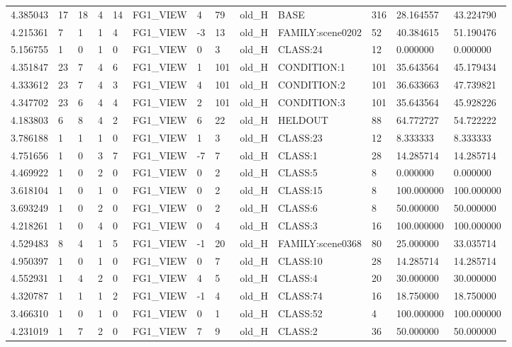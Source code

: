 \begin{tabular}{lllllllllllll}
4.385043 & 17 & 18 & 4 & 14 & FG1\_VIEW & 4 & 79 & old\_H & BASE & 316 & 28.164557 & 43.224790 \\
4.215361 & 7 & 1 & 1 & 4 & FG1\_VIEW & -3 & 13 & old\_H & FAMILY:scene0202 & 52 & 40.384615 & 51.190476 \\
5.156755 & 1 & 0 & 1 & 0 & FG1\_VIEW & 0 & 3 & old\_H & CLASS:24 & 12 & 0.000000 & 0.000000 \\
4.351847 & 23 & 7 & 4 & 6 & FG1\_VIEW & 1 & 101 & old\_H & CONDITION:1 & 101 & 35.643564 & 45.179434 \\
4.333612 & 23 & 7 & 4 & 3 & FG1\_VIEW & 4 & 101 & old\_H & CONDITION:2 & 101 & 36.633663 & 47.739821 \\
4.347702 & 23 & 6 & 4 & 4 & FG1\_VIEW & 2 & 101 & old\_H & CONDITION:3 & 101 & 35.643564 & 45.928226 \\
4.183803 & 6 & 8 & 4 & 2 & FG1\_VIEW & 6 & 22 & old\_H & HELDOUT & 88 & 64.772727 & 54.722222 \\
3.786188 & 1 & 1 & 1 & 0 & FG1\_VIEW & 1 & 3 & old\_H & CLASS:23 & 12 & 8.333333 & 8.333333 \\
4.751656 & 1 & 0 & 3 & 7 & FG1\_VIEW & -7 & 7 & old\_H & CLASS:1 & 28 & 14.285714 & 14.285714 \\
4.469922 & 1 & 0 & 2 & 0 & FG1\_VIEW & 0 & 2 & old\_H & CLASS:5 & 8 & 0.000000 & 0.000000 \\
3.618104 & 1 & 0 & 1 & 0 & FG1\_VIEW & 0 & 2 & old\_H & CLASS:15 & 8 & 100.000000 & 100.000000 \\
3.693249 & 1 & 0 & 2 & 0 & FG1\_VIEW & 0 & 2 & old\_H & CLASS:6 & 8 & 50.000000 & 50.000000 \\
4.218261 & 1 & 0 & 4 & 0 & FG1\_VIEW & 0 & 4 & old\_H & CLASS:3 & 16 & 100.000000 & 100.000000 \\
4.529483 & 8 & 4 & 1 & 5 & FG1\_VIEW & -1 & 20 & old\_H & FAMILY:scene0368 & 80 & 25.000000 & 33.035714 \\
4.950397 & 1 & 0 & 1 & 0 & FG1\_VIEW & 0 & 7 & old\_H & CLASS:10 & 28 & 14.285714 & 14.285714 \\
4.552931 & 1 & 4 & 2 & 0 & FG1\_VIEW & 4 & 5 & old\_H & CLASS:4 & 20 & 30.000000 & 30.000000 \\
4.320787 & 1 & 1 & 1 & 2 & FG1\_VIEW & -1 & 4 & old\_H & CLASS:74 & 16 & 18.750000 & 18.750000 \\
3.466310 & 1 & 0 & 1 & 0 & FG1\_VIEW & 0 & 1 & old\_H & CLASS:52 & 4 & 100.000000 & 100.000000 \\
4.231019 & 1 & 7 & 2 & 0 & FG1\_VIEW & 7 & 9 & old\_H & CLASS:2 & 36 & 50.000000 & 50.000000 \\

\end{tabular}
